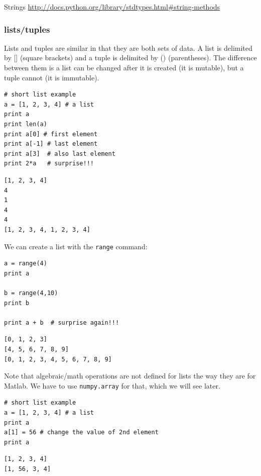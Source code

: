\documentclass[11pt]{article}
\begin{document}
Strings \url{http://docs.python.org/library/stdtypes.html\#string-methods}


\subsubsection{lists/tuples}
\label{sec:org818b8f8}

Lists and tuples are similar in that they are both sets of data. A list is delimited by [] (square brackets) and a tuple is delimited by () (parentheses). The difference between them is a list can be changed after it is created (it is mutable), but a tuple cannot (it is immutable).

\begin{verbatim}
# short list example
a = [1, 2, 3, 4] # a list
print a
print len(a)
print a[0] # first element
print a[-1] # last element
print a[3]  # also last element
print 2*a   # surprise!!!
\end{verbatim}

\begin{verbatim}
[1, 2, 3, 4]
4
1
4
4
[1, 2, 3, 4, 1, 2, 3, 4]
\end{verbatim}

We can create a list with the \texttt{range} command:

\begin{verbatim}
a = range(4)
print a

b = range(4,10)
print b

print a + b  # surprise again!!!
\end{verbatim}

\begin{verbatim}
[0, 1, 2, 3]
[4, 5, 6, 7, 8, 9]
[0, 1, 2, 3, 4, 5, 6, 7, 8, 9]
\end{verbatim}

Note that algebraic/math operations are not defined for lists the way they are for Matlab. We have to use \texttt{numpy.array} for that, which we will see later.

\begin{verbatim}
# short list example
a = [1, 2, 3, 4] # a list
print a
a[1] = 56 # change the value of 2nd element
print a
\end{verbatim}

\begin{verbatim}
[1, 2, 3, 4]
[1, 56, 3, 4]
\end{verbatim}
\end{document}
